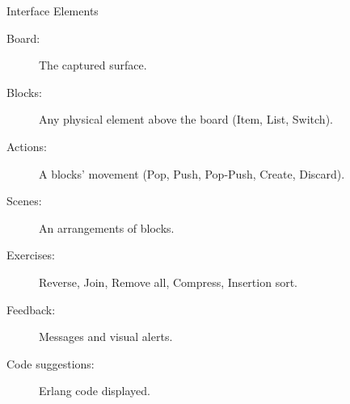 \begin{frame}{Interface Elements}
  \begin{description}
  \item[Board:] The captured surface.
  \item[Blocks:] Any physical element above the board (Item, List,
    Switch).
  \item[Actions:] A blocks' movement (Pop, Push, Pop-Push, Create,
    Discard).
  \item[Scenes:] An arrangements of blocks.
  \item[Exercises:] Reverse, Join, Remove all, Compress, Insertion sort.
  \item[Feedback:] Messages and visual alerts.
  \item[Code suggestions:] Erlang code displayed.
  \end{description}
\end{frame}

